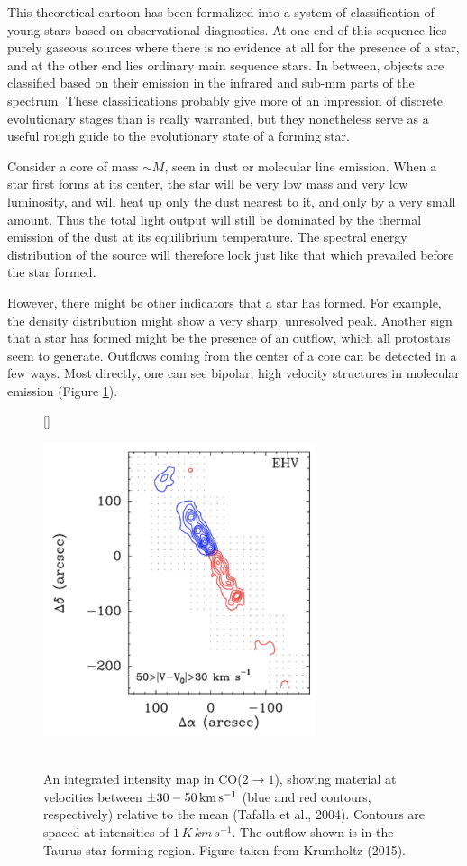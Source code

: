 \documentclass[a4paper,10pt]{article}
\begin{document}
{\noindent}This theoretical cartoon has been formalized into a system of classification of young stars based on observational diagnostics. At one end of this sequence lies purely gaseous sources where there is no evidence at all for the presence of a star, and at the other end lies ordinary main sequence stars. In between, objects are classified based on their emission in the infrared and sub-mm parts of the spectrum. These classifications probably give more of an impression of discrete evolutionary stages than is really warranted, but they nonetheless serve as a useful rough guide to the evolutionary state of a forming star.

{\noindent}Consider a core of mass $\sim M$, seen in dust or molecular line emission. When a star first forms at its center, the star will be very low mass and very low luminosity, and will heat up only the dust nearest to it, and only by a very small amount. Thus the total light output will still be dominated by the thermal emission of the dust at its equilibrium temperature. The spectral energy distribution of the source will therefore look just like that which prevailed before the star formed.

{\noindent}However, there might be other indicators that a star has formed. For example, the density distribution might show a very sharp, unresolved peak. Another sign that a star has formed might be the presence of an outflow, which all protostars seem to generate. Outflows coming from the center of a core can be detected in a few ways. Most directly, one can see bipolar, high velocity structures in molecular emission (Figure \ref{fig:outflows}).

\begin{figure}[h]
    [\FBwidth]
    {\caption{\footnotesize{\\An integrated intensity map in CO($2\rightarrow1$), showing material at velocities between $\pm30-50\,{\rm km\,s^{-1}}$ (blue and red contours, respectively) relative to the mean (Tafalla et al., 2004). Contours are spaced at intensities of $1\,K\,km\,s^{-1}$. The outflow shown is in the Taurus star-forming region. Figure taken from Krumholtz (2015).}}
    \label{fig:outflows}}
    {\includegraphics[width=8cm]{figures/Outflows.png}}
\end{figure}
\end{document}
